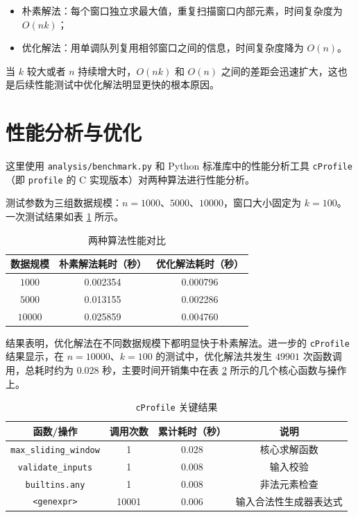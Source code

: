 \documentclass[a4paper,UTF8,fontset=none]{ctexart}
\begin{document}
\begin{itemize}
    \item 朴素解法：每个窗口独立求最大值，重复扫描窗口内部元素，时间复杂度为 $O(nk)$；
    \item 优化解法：用单调队列复用相邻窗口之间的信息，时间复杂度降为 $O(n)$。
\end{itemize}

当 $k$ 较大或者 $n$ 持续增大时，$O(nk)$ 和 $O(n)$ 之间的差距会迅速扩大，这也是后续性能测试中优化解法明显更快的根本原因。

\section{性能分析与优化}

这里使用 \texttt{analysis/benchmark.py} 和 Python 标准库中的性能分析工具 \texttt{cProfile}（即 \texttt{profile} 的 C 实现版本）对两种算法进行性能分析。

测试参数为三组数据规模：$n=1000$、$5000$、$10000$，窗口大小固定为 $k=100$。一次测试结果如表 \ref{tab:performance} 所示。

\begin{table}[H]
    \centering
    \begin{tabular}{ccc}
    \toprule
    数据规模 & 朴素解法耗时（秒） & 优化解法耗时（秒） \\
    \midrule
    $1000$ & 0.002354 & 0.000796 \\
    $5000$ & 0.013155 & 0.002286 \\
    $10000$ & 0.025859 & 0.004760 \\
    \bottomrule
    \end{tabular}
    \caption{两种算法性能对比}
    \label{tab:performance}
\end{table}

结果表明，优化解法在不同数据规模下都明显快于朴素解法。进一步的 \texttt{cProfile} 结果显示，在 $n=10000$、$k=100$ 的测试中，优化解法共发生 $49901$ 次函数调用，总耗时约为 $0.028$ 秒，主要时间开销集中在表 \ref{tab:cprofile} 所示的几个核心函数与操作上。

\begin{table}[H]
    \centering
    \begin{tabular}{cccc}
    \toprule
    函数/操作 & 调用次数 & 累计耗时（秒） & 说明 \\
    \midrule
    \texttt{max\_sliding\_window} & 1 & 0.028 & 核心求解函数 \\
    \texttt{validate\_inputs} & 1 & 0.008 & 输入校验 \\
    \texttt{builtins.any} & 1 & 0.008 & 非法元素检查 \\
    \texttt{<genexpr>} & 10001 & 0.006 & 输入合法性生成器表达式 \\
    \bottomrule
    \end{tabular}
    \caption{\texttt{cProfile} 关键结果}
    \label{tab:cprofile}
\end{table}
\end{document}
